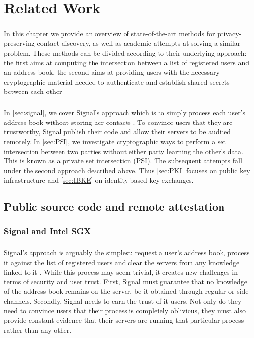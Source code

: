 \chapter{Related Work}
\label{chap:litreview}

\paragraph{} In this chapter we provide an overview of state-of-the-art methods for privacy-preserving contact discovery, as well as academic attempts at solving a similar problem. These methods can be divided according to their underlying approach: the first aims at computing the intersection between a list of registered users and an address book, the second aims at providing users with the necessary cryptographic material needed to authenticate and establish shared secrets between each other


\paragraph{} In \autoref{sec:signal}, we cover Signal's approach which is to simply process each user's address book without storing her contacts \cite{Signal:Tech}. To convince users that they are trustworthy, Signal publish their code and allow their servers to be audited remotely. In \autoref{sec:PSI}, we investigate cryptographic ways to perform a set intersection between two parties without either party learning the other's data. This is known as a private set intersection (PSI). The subsequent attempts fall under the second approach described above. Thus \autoref{sec:PKI} focuses on public key infrastructure and \autoref{sec:IBKE} on identity-based key exchanges.

\section{Public source code and remote attestation}
\label{sec:signal}

\subsection{Signal and Intel SGX}

\paragraph{} Signal's approach is arguably the simplest: request a user's address book, process it against the list of registered users and clear the servers from any knowledge linked to it \cite{Signal:Tech}. While this process may seem trivial, it creates new challenges in terms of security and user trust. First, Signal must guarantee that no knowledge of the address book remains on the server, be it obtained through regular or side channels. Secondly, Signal needs to earn the trust of it users. Not only do they need to convince users that their process is completely oblivious, they must also provide constant evidence that their servers are running that particular process rather than any other.


